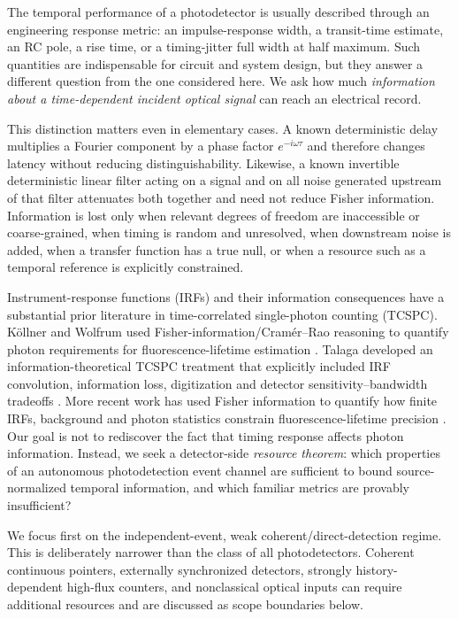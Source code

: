 \documentclass[aps,prapplied,preprint,nofootinbib]{revtex4-2}
\begin{document}
The temporal performance of a photodetector is usually described through an engineering response metric: an impulse-response width, a transit-time estimate, an RC pole, a rise time, or a timing-jitter full width at half maximum.  Such quantities are indispensable for circuit and system design, but they answer a different question from the one considered here.  We ask how much \emph{information about a time-dependent incident optical signal} can reach an electrical record.

This distinction matters even in elementary cases.  A known deterministic delay multiplies a Fourier component by a phase factor $e^{-i\omega\tau}$ and therefore changes latency without reducing distinguishability.  Likewise, a known invertible deterministic linear filter acting on a signal and on all noise generated upstream of that filter attenuates both together and need not reduce Fisher information.  Information is lost only when relevant degrees of freedom are inaccessible or coarse-grained, when timing is random and unresolved, when downstream noise is added, when a transfer function has a true null, or when a resource such as a temporal reference is explicitly constrained.

Instrument-response functions (IRFs) and their information consequences have a substantial prior literature in time-correlated single-photon counting (TCSPC).  K\"ollner and Wolfrum used Fisher-information/Cram\'er--Rao reasoning to quantify photon requirements for fluorescence-lifetime estimation \cite{KollnerWolfrum1992}.  Talaga developed an information-theoretical TCSPC treatment that explicitly included IRF convolution, information loss, digitization and detector sensitivity--bandwidth tradeoffs \cite{Talaga2009}.  More recent work has used Fisher information to quantify how finite IRFs, background and photon statistics constrain fluorescence-lifetime precision \cite{Bouchet2019,TrinhEsposito2021}.  Our goal is not to rediscover the fact that timing response affects photon information.  Instead, we seek a detector-side \emph{resource theorem}: which properties of an autonomous photodetection event channel are sufficient to bound source-normalized temporal information, and which familiar metrics are provably insufficient?

We focus first on the independent-event, weak coherent/direct-detection regime.  This is deliberately narrower than the class of all photodetectors.  Coherent continuous pointers, externally synchronized detectors, strongly history-dependent high-flux counters, and nonclassical optical inputs can require additional resources and are discussed as scope boundaries below.
\end{document}
